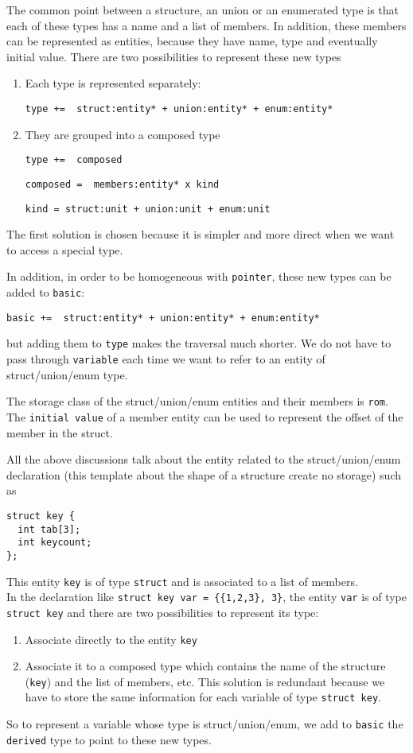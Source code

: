 \documentclass[a4paper]{report}
\begin{document}
The common point between  a structure, an union or an enumerated type is that each of these
types has a name and a list of members. In addition, these 
 members can be represented as entities, because they have name,
type and eventually initial value. There are two possibilities to
represent these new types
\begin{enumerate}
\item Each type is represented separately:

\verb/type +=  struct:entity* + union:entity* + enum:entity*/ 
\item They are grouped into a composed type

\verb/type +=  composed/ 

\verb/composed =  members:entity* x kind/

\verb/kind = struct:unit + union:unit + enum:unit/
\end{enumerate}
The first solution is chosen because it is simpler and more direct when
we want to access a special type. 

In addition, in order to be homogeneous with \verb/pointer/, these
new types can be added to \verb/basic/:

\verb/basic +=  struct:entity* + union:entity* + enum:entity*/ 

but adding them to \verb/type/ makes the traversal much shorter. We do
not have to pass through \verb/variable/ each time we want to refer to an
entity of struct/union/enum type. 

The storage class of the struct/union/enum entities and their
members is \verb/rom/. The \verb/initial value/ of a member entity can be used to represent
the offset of the member in the struct.   

All the above discussions talk about the entity related to the
struct/union/enum declaration (this template about the shape of a
structure create no storage) such as 
\begin{lstlisting}
struct key {
  int tab[3];
  int keycount;
};
\end{lstlisting}
This entity \verb/key/ is of type \verb/struct/ and is associated to a list
of members.\\

In the declaration like \lstinline/struct key var = {{1,2,3}, 3}/, the entity
\verb/var/ is of type \lstinline/struct key/ and there are two possibilities to
represent its type: 
\begin{enumerate}
\item Associate directly  to the entity \verb/key/
\item Associate it to a composed type which contains the name of the structure (\verb/key/)
and the list of
members, etc. This solution is redundant because we have to store the same
information for each variable of type
\lstinline/struct key/. 
\end{enumerate}
So to represent a variable whose type is struct/union/enum, we add to \verb/basic/ the \verb/derived/ type to point to
these new types. 
\end{document}

